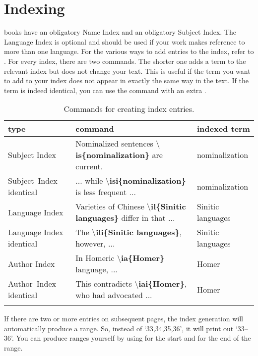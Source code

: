 \chapter{Indexing}
\lsp books have an obligatory Name Index and an obligatory Subject Index. The Language Index is optional and should be used if your work makes reference to more than one language. 
For the various ways to add entries to the index, refer to . For every index, there are two commands. The shorter one adds a term to the relevant index but does not change your text. This is useful if the term you want to add to your index does not appear in exactly the same way in the text. If the term is indeed identical, you can use the command with an extra .

\begin{table}[h]
\caption{Commands for creating index entries.}
\label{tab:latex:indexentriese}
 \begin{tabular}{p{2.5cm}>{\tt\small\raggedright}p{6.5cm}p{3cm}}
  \lsptoprule
  type & \rm\normalsize command & indexed term \\
  \midrule
  Subject Index& Nominalized sentences \textbf{$\setminus$is\{nominalization\}} are current. & nomina\-lization \\
  \mbox{Subject Index} identical& ... while \textbf{$\setminus$isi\{nominalization\}} is less frequent ...  & nomina\-lization \\[2em]
  Language Index & Varieties of Chinese \textbf{$\setminus$il\{Sinitic languages\}} differ in that ...& Sinitic languages \\
  Language Index identical& The \textbf{$\setminus$ili\{Sinitic languages\}}, \mbox{however}, ... & Sinitic languages \\[2em]
  Author Index & In Homeric \textbf{$\setminus$ia\{Homer\}} language, ...  & Homer\\
  \mbox{Author Index} identical & This contradicts \textbf{$\setminus$iai\{Homer\}}, who had advocated ... & Homer \\
  \lspbottomrule
 \end{tabular}
\end{table}

If there are two or more entries on subsequent pages, the index generation will automatically produce a range. So, instead of `33,34,35,36', it will print out `33--36'. You can produce ranges yourself by using  for the start and   for the end of the range. 

